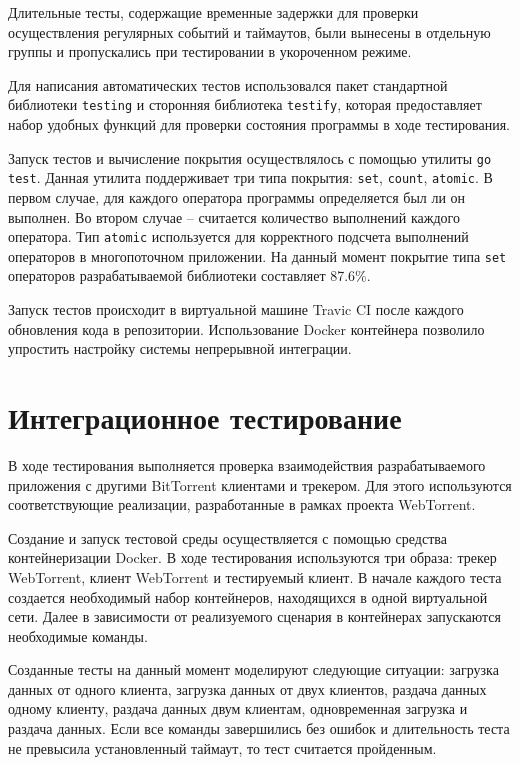 \documentclass[a4paper,14pt]{extarticle}
\begin{document}
Длительные тесты, содержащие временные задержки для проверки осуществления 
регулярных событий и таймаутов, были вынесены в отдельную группы и пропускались 
при тестировании в укороченном режиме.

Для написания автоматических тестов использовался пакет стандартной библиотеки  
\texttt{testing} и сторонняя библиотека \texttt{testify}, которая 
предоставляет набор удобных функций для проверки состояния программы в ходе 
тестирования. 

Запуск тестов и вычисление покрытия осуществлялось с помощью утилиты \texttt{go 
test}. Данная утилита поддерживает три типа покрытия: \texttt{set}, 
\texttt{count}, \texttt{atomic}. В первом случае, для каждого оператора 
программы определяется был ли он выполнен. Во втором случае -- считается 
количество выполнений каждого оператора. Тип \texttt{atomic} используется 
для корректного подсчета выполнений операторов в многопоточном приложении. На 
данный момент покрытие типа \texttt{set} операторов разрабатываемой библиотеки 
составляет 87.6\%. 

Запуск тестов происходит в виртуальной машине Travic CI после каждого 
обновления кода в репозитории. Использование Docker контейнера позволило 
упростить настройку системы непрерывной интеграции.
   
\section{Интеграционное тестирование}\label{sec:int-test}

В ходе тестирования выполняется проверка взаимодействия разрабатываемого 
приложения с другими BitTorrent клиентами и трекером. Для этого используются 
соответствующие реализации, разработанные в рамках проекта WebTorrent. 

Создание и запуск тестовой среды осуществляется с помощью средства 
контейнеризации Docker. В ходе тестирования используются три образа: 
 трекер WebTorrent, клиент WebTorrent  и тестируемый клиент. В начале каждого 
теста создается необходимый набор контейнеров, находящихся в одной виртуальной 
сети. Далее в зависимости от реализуемого сценария в контейнерах запускаются 
необходимые команды. 

Созданные тесты на данный момент моделируют следующие ситуации: загрузка данных 
от одного клиента, загрузка данных от двух клиентов, раздача данных одному 
клиенту, раздача данных двум клиентам, одновременная загрузка и раздача данных. 
Если все команды завершились без ошибок и длительность теста не превысила 
установленный таймаут, то тест считается пройденным. 
\end{document}
